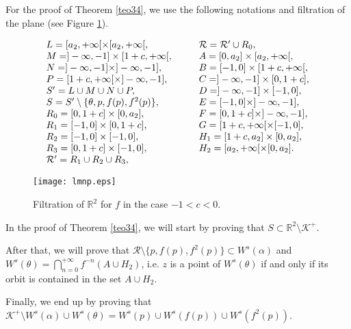 \documentclass[11pt]{amsart}
\theoremstyle{definition}
\begin{document}
For the proof of Theorem \ref{teo34}, we use the following notations and filtration of the plane (see Figure \ref{figlmnp}).


\begin{eqnarray} \label{notacao}
\begin{array}{lcl}
L=[a_2,+\infty [ \times [a_2,+\infty [, & \hspace{.3cm} & \mathcal{R}=\mathcal{R}'\cup R_0, \\
M=]-\infty,-1 ] \times [1+c,+\infty [,  & & A=[0,a_2]\times[a_2,+\infty[, \\
N=]-\infty,-1] \times ]-\infty,-1 ],    & & B=[-1,0]\times[1+c,+\infty[, \\
P=[1+c,+\infty [ \times ]-\infty,-1],   & & C=]-\infty,-1]\times[0,1+c],  \\
S'=L\cup M\cup N\cup P,                 & & D=]-\infty,-1]\times[-1,0], \\
S=S'\setminus\{\theta,p,f(p),f^2(p)\},  & & E=[-1,0]\times]-\infty,-1], \\
R_0=[0,1+c]\times [0,a_2],              & & F=[0,1+c]\times]-\infty,-1], \\
R_1=[-1,0]\times [0,1+c],               & & G=[1+c,+\infty[\times[-1,0],  \\
R_2=[-1,0]\times [-1,0],                & & H_1=[1+c,a_2]\times[0,a_2],  \\
R_3=[0,1+c]\times [-1,0],               & & H_2=[a_2,+\infty[\times[0,a_2]. \\
\mathcal{R}' =R_1 \cup R_2\cup R_3, & & 
\end{array}
\end{eqnarray}

\begin{figure}[!h]
	\centering
	\texttt{[image: lmnp.eps]}
	\caption{Filtration of $\mathbb{R}^2$ for $f$ in the case $-1<c<0$.} \label{figlmnp}
\end{figure}


In the proof of Theorem \ref{teo34}, we will start by proving that $S\subset \mathbb{R}^2\setminus \mathcal{K}^+$.

After that, we will prove that $\mathcal{R}\setminus \{p,f(p),f^2(p)\}\subset W^s(\alpha)$ and $W^s(\theta)=\bigcap_{n=0}^{+\infty}f^{-n}(A\cup H_2)$, i.e. $z$ is a point of $W^s(\theta)$ if and only if its orbit is contained in the set $A\cup H_2$.

Finally, we end up by proving that $\mathcal{K}^+\setminus W^s(\alpha)\cup W^s(\theta)=W^s(p)\cup W^s(f(p))\cup W^s(f^2(p))$.
\end{document}
